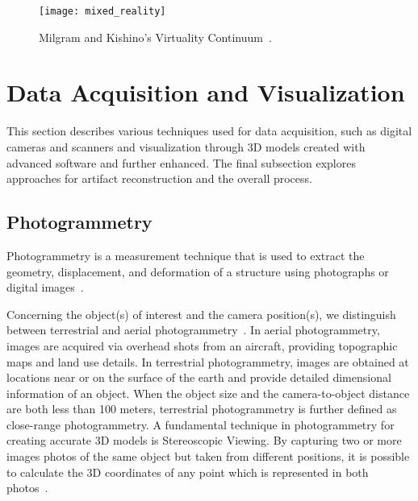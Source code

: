 \begin{figure}[htbp]
    \centering
    \texttt{[image: mixed\_reality]}
    \caption{Milgram and Kishino’s Virtuality Continuum~\cite{milgram1994taxonomy}.}
    \label{fig:mixed_reality} 
\end{figure} 
\FloatBarrier


\section{ Data Acquisition and Visualization}
\label{sec:data}

This section describes various techniques used for data acquisition, such as digital cameras and scanners and visualization through 3D models created with advanced software and further enhanced. 
The final subsection explores approaches for artifact reconstruction and the overall process.

\subsection{Photogrammetry}
\label{sec:photogrammetry}

Photogrammetry is a measurement technique that is used to extract the geometry, displacement, and deformation of a
structure using photographs or digital images~\cite{Baqersad2017Photogrammetry}.

Concerning the object(s) of interest and the camera position(s), we distinguish
between terrestrial and aerial photogrammetry~\cite{linder2016digital}.
In aerial photogrammetry, images are acquired via overhead shots from an aircraft, providing topographic maps and land use details. In terrestrial photogrammetry, images are obtained at locations near or on the surface of
the earth and provide detailed dimensional information of an object. When the object size and the camera-to-object 
distance are both less than 100 meters, terrestrial photogrammetry is further defined as close-range photogrammetry. A fundamental technique in photogrammetry for creating accurate \gls{3D} models is Stereoscopic Viewing. 
By capturing two or more images photos of the same object but taken from different positions, it is possible to calculate the \gls{3D} coordinates of any point which is represented in both photos~\cite{linder2016digital}. 

